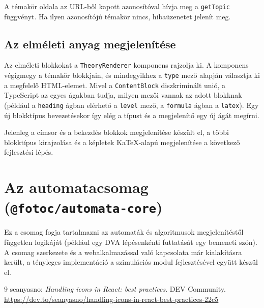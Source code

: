 \documentclass[12pt,a4paper]{report}
\begin{document}
A témakör oldala az URL-ből kapott azonosítóval hívja meg a
\texttt{getTopic} függvényt. Ha ilyen azonosítójú témakör nincs,
hibaüzenetet jelenít meg.

\subsection{Az elméleti anyag megjelenítése}

Az elméleti blokkokat a \texttt{TheoryRenderer} komponens rajzolja ki.
A komponens végigmegy a témakör blokkjain, és mindegyikhez a
\texttt{type} mező alapján választja ki a megfelelő HTML-elemet. Mivel
a \texttt{ContentBlock} diszkriminált unió, a TypeScript az egyes
ágakban tudja, milyen mezői vannak az adott blokknak (például a
\texttt{heading} ágban elérhető a \texttt{level} mező, a
\texttt{formula} ágban a \texttt{latex}). Egy új blokktípus
bevezetésekor így elég a típust és a megjelenítő egy új ágát megírni.

Jelenleg a címsor és a bekezdés blokkok megjelenítése készült el, a
többi blokktípus kirajzolása és a képletek KaTeX-alapú megjelenítése
a következő fejlesztési lépés.

\section{Az automatacsomag (\texttt{@fotoc/automata-core})}

Ez a csomag fogja tartalmazni az automaták és algoritmusok
megjelenítéstől független logikáját (például egy DVA lépésenkénti
futtatását egy bemeneti szón). A csomag szerkezete és a webalkalmazással
való kapcsolata már kialakításra került, a tényleges implementáció a
szimulációs modul fejlesztésével együtt készül el.

\begin{thebibliography}{9}
        seanyasno: \emph{Handling icons in React: best practices}. DEV Community.
        \url{https://dev.to/seanyasno/handling-icons-in-react-best-practices-22c5}
\end{thebibliography}
\end{document}
